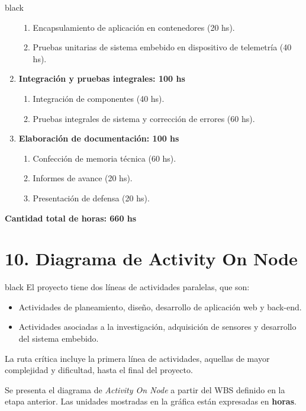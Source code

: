 \documentclass[
11pt, %
codirector, %
]{charter}
\begin{document}
\begin{consigna}{black}
\begin{enumerate}
\begin{enumerate}
	\item Encapsulamiento de aplicación en contenedores (20 hs).
	\item Pruebas unitarias de sistema embebido en dispositivo de telemetría (40 hs).
	\end{enumerate}
\item \textbf{Integración y pruebas integrales: 100 hs}
	\begin{enumerate}
	\item Integración de componentes (40 hs).
	\item Pruebas integrales de sistema y corrección de errores (60 hs).
	\end{enumerate}
\item \textbf{Elaboración de documentación: 100 hs}
	\begin{enumerate}
	\item Confección de memoria técnica (60 hs).
	\item Informes de avance (20 hs).
	\item Presentación de defensa (20 hs).
	\end{enumerate}
\end{enumerate}

\textbf{Cantidad total de horas: 660 hs}

\end{consigna}

\section{10. Diagrama de Activity On Node}
\label{sec:AoN}

\begin{consigna}{black}
El proyecto tiene dos líneas de actividades paralelas, que son:
\begin{itemize}
		\item Actividades de planeamiento, diseño, desarrollo de aplicación web y back-end. 
		\item Actividades asociadas a la investigación, adquisición de sensores y desarrollo del sistema embebido.
\end{itemize}

La ruta crítica incluye la primera línea de actividades, aquellas de mayor complejidad y dificultad, hasta el final del proyecto.

Se presenta el diagrama de \textit{Activity On Node} a partir del WBS definido en la etapa anterior. Las unidades mostradas en la gráfica están expresadas en \textbf{horas}.




\end{consigna}
\end{document}
